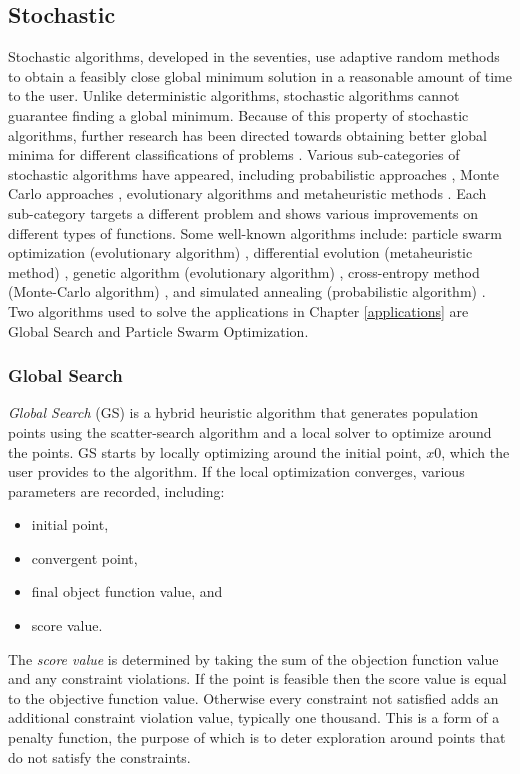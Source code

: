 \subsection{Stochastic}
Stochastic algorithms, developed in the seventies, use adaptive random methods to obtain a feasibly close global minimum solution in a reasonable amount of time to the user. Unlike deterministic algorithms, stochastic algorithms cannot guarantee finding a global minimum. Because of this property of stochastic algorithms, further research has been directed towards obtaining better global minima for different classifications of problems \cite{Aguiar,Pinter2002}. Various sub-categories of stochastic algorithms have appeared, including probabilistic approaches \cite{Aguiar}, Monte Carlo approaches \cite{Aguiar}, evolutionary algorithms \cite{Aguiar} and metaheuristic methods \cite{Can2015}. Each sub-category targets a different problem
and shows various improvements on different types of functions. Some well-known algorithms include: particle swarm optimization (evolutionary algorithm) \cite{Kennedy1995}, differential evolution (metaheuristic method) \cite{Aguiar}, genetic algorithm (evolutionary algorithm) \cite{Aguiar}, cross-entropy method (Monte-Carlo algorithm) \cite{Aguiar}, and simulated annealing (probabilistic algorithm) \cite{Aguiar}. Two algorithms used to solve the applications in Chapter \ref{applications} are Global Search and Particle Swarm Optimization.
\subsubsection{Global Search}
\textit{Global Search} (GS) is a hybrid heuristic algorithm that generates population points using the scatter-search algorithm \cite{Glover1998a} and a local solver to optimize around the points. GS starts by locally optimizing around the initial point, $x0$, which the user provides to the algorithm. If the local optimization converges, various parameters are recorded, including:
\begin{itemize}
    \item initial point,
    \item convergent point,
    \item final object function value, and
    \item score value. 
\end{itemize}

The \textit{score value} is determined by taking the sum of the objection function value and any constraint violations. If the point is feasible then the score value is equal to the objective function value. Otherwise every constraint not satisfied adds an additional constraint violation value, typically one thousand. This is a form of a penalty function, the purpose of which is to deter exploration around points that do not satisfy the constraints. 

